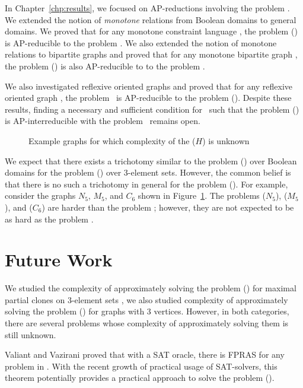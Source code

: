 In Chapter~\ref{chp:results}, we focused on AP-reductions involving the problem \cbis\@.
We extended the notion of \emph{monotone} relations from Boolean domains to 
general domains. We proved that for any monotone constraint language \mrelset,
the problem \ccsp(\mrelset) is AP-reducible to the problem \cbis\@.
We also extended the notion of monotone relations to bipartite graphs 
and proved that for any monotone bipartite graph \mH, the problem \chom(\mH)  
is also AP-reducible to to the problem \cbis\@.

We also investigated reflexive oriented graphs and proved that 
for any reflexive oriented graph \mH, the problem \cbis\ is
AP-reducible to the problem \chom(\mH).
Despite these results, finding a necessary and sufficient condition for \mrelset\ such that 
the problem \ccsp(\mrelset) is AP-interreducible with the problem \cbis\ remains open.

\begin{figure}
\centering
\subfigure[\ensuremath{N_5}]{\label{fig:n5}}\hfill
\subfigure[\ensuremath{M_5}]{\label{fig:m5}}\hfill
\subfigure[\ensuremath{C_6}]{\label{fig:c6}}
\caption{Example graphs for which complexity of the \chom(\ensuremath{H}) is unknown}
\label{fig:unknown}
\end{figure}

We expect that there exists a trichotomy similar to the problem \ccsp(\mrelset) over Boolean domains
for the problem \ccsp(\mrelset) over 3-element sets.
However, the common belief is that there is no such a trichotomy in general for
the problem \ccsp(\mrelset).
For example, consider the graphs \(N_5\), \(M_5\), and \(C_6\) shown in Figure~\ref{fig:unknown}.
The problems \chom(\(N_5\)), \chom(\(M_5\)), and \chom(\(C_6\)) are harder than
the problem \cbis; however, they are not expected to be as hard as the problem \csat\@.

\section{Future Work}
We studied the complexity of approximately solving 
the problem \ccsp(\mrelset) for maximal partial clones on
3-element sets \cite{mvl}, we also studied complexity of approximately solving 
the problem \chom(\mH) for graphs with 3 vertices. However, in both categories,
there are several problems whose complexity of approximately solving them is still unknown.

Valiant and Vazirani \cite{valvaz} proved that with a SAT oracle, there is FPRAS for any 
problem in \cp\@. With the recent growth of practical usage of SAT-solvers, this theorem
potentially provides a practical approach to solve the problem \ccsp(\mrelset).

